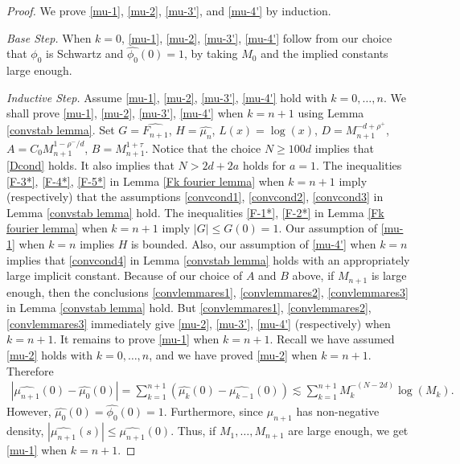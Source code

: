 \documentclass{amsart}
\numberwithin{equation}{section}
\theoremstyle{definition}
\theoremstyle{definition}
\begin{document}
\begin{proof}
We prove \eqref{mu-1}, \eqref{mu-2}, \eqref{mu-3'}, and \eqref{mu-4'} by induction. 

\textit{Base Step.}  
When $k=0$, \eqref{mu-1}, \eqref{mu-2}, \eqref{mu-3'}, \eqref{mu-4'} follow from 
our choice that $\phi_0$ is Schwartz and $\widehat{\phi_0}(0)=1$, by taking $M_0$ and the implied constants large enough. 


\textit{Inductive Step.} 
Assume \eqref{mu-1}, \eqref{mu-2}, \eqref{mu-3'}, \eqref{mu-4'} hold with $k=0,\ldots,n$.
We shall prove \eqref{mu-1}, \eqref{mu-2}, \eqref{mu-3'}, \eqref{mu-4'} when $k=n+1$ 
using Lemma \ref{convstab lemma}.
Set $G = \widehat{F_{n+1}}$, 
$H = \widehat{\mu_n}$, 
$L(x) = \log(x)$, 
$D = 
M_{n+1}^{-d+\rho^+}
$, 
$A = C_0 M_{n+1}^{1-\rho^{-}/d} $, 
$B = M_{n+1}^{1+\tau}$. 
Notice that the choice $N \geq 100d$ implies that \eqref{Dcond} holds. 
It also implies that $N>2d+2a$ holds for $a = 1$. 
The inequalities \eqref{F-3*}, \eqref{F-4*}, \eqref{F-5*}  in Lemma \ref{Fk fourier lemma} when $k=n+1$ imply (respectively) that the assumptions \eqref{convcond1}, \eqref{convcond2}, \eqref{convcond3} in Lemma \ref{convstab lemma} hold. 
The inequalities \eqref{F-1*}, \eqref{F-2*} in Lemma \ref{Fk fourier lemma} when $k=n+1$ imply $|G| \leq G(0)=1$. 
Our assumption of \eqref{mu-1} when $k=n$ implies $H$ is bounded. 
Also, our assumption of \eqref{mu-4'} when $k=n$ implies that \eqref{convcond4} in Lemma \ref{convstab lemma} holds with an appropriately large implicit constant. 
Because of our choice of $A$ and $B$ above, 
if $M_{n+1}$ is large enough, then the conclusions \eqref{convlemmares1}, \eqref{convlemmares2}, \eqref{convlemmares3} in Lemma \ref{convstab lemma} hold. 
But \eqref{convlemmares1}, \eqref{convlemmares2}, \eqref{convlemmares3} immediately give 
\eqref{mu-2}, \eqref{mu-3'}, \eqref{mu-4'} (respectively) when $k=n+1$. 
It remains to prove \eqref{mu-1} when $k=n+1$. 
Recall we have assumed 
\eqref{mu-2} holds with $k=0,\ldots,n$, and we have proved \eqref{mu-2} when $k=n+1$. 
Therefore 
\begin{align*}
|\widehat{\mu_{n+1}}(0) - \widehat{\mu_0}(0)|
= 
\sum_{k=1}^{n+1} (\widehat{\mu_{k}}(0) - \widehat{\mu_{k-1}}(0))
\lesssim  \sum_{k=1}^{n+1} 
M_{k}^{-(N-2d)}\log(M_{k}).
\end{align*}
However,  
$\widehat{\mu_0}(0) = \widehat{\phi_0}(0) = 1$.
Furthermore, 
since $\mu_{n+1}$ has non-negative density, 
$|\widehat{\mu_{n+1}}(s)| \leq \widehat{\mu_{n+1}}(0)$. 
Thus, 
if $M_{1},\ldots,M_{n+1}$ are large enough, we get \eqref{mu-1} when $k=n+1$. 
%
\end{proof}
\end{document}
